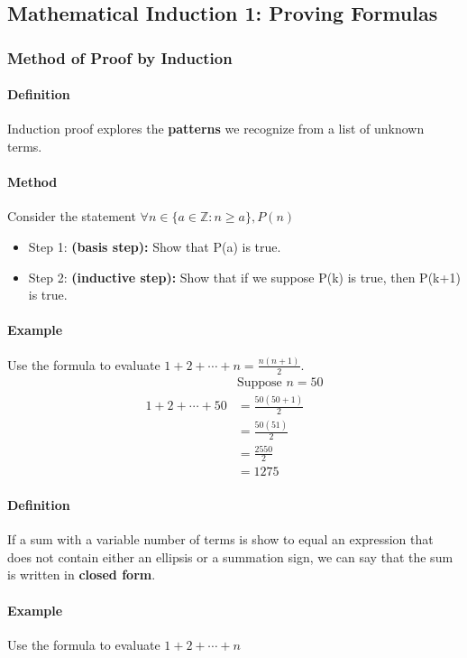 \subsection{Mathematical Induction 1: Proving Formulas}
\hrulefill

\subsubsection*{Method of Proof by Induction}
\paragraph*{Definition}
Induction proof explores the \textbf{patterns} we recognize from a list of unknown terms.

\paragraph*{Method}
Consider the statement $\forall n \in \{a \in \mathbb{Z} : n \geq a\}, P(n)$
\begin{itemize}
    \item Step 1: \textbf{(basis step):} Show that P(a) is true.
    \item Step 2: \textbf{(inductive step):} Show that if we suppose P(k) is true, then P(k+1) is true.
\end{itemize}

\paragraph*{Example}
Use the formula to evaluate $1 + 2 + \cdots + n = \frac{n(n+1)}{2}$.
\begin{align*}
    & \text{Suppose } n = 50\\
    1 + 2 + \cdots + 50 &= \frac{50(50+1)}{2}\\
    &= \frac{50(51)}{2}\\
    &= \frac{2550}{2}\\
    &= 1275
\end{align*}


\paragraph*{Definition} If a sum with a variable number of terms is show to equal an expression that does not contain either an ellipsis 
or a summation sign, we can say that the sum is written in \textbf{closed form}.

\paragraph*{Example}
Use the formula to evaluate $1 + 2 + \cdots + n$

